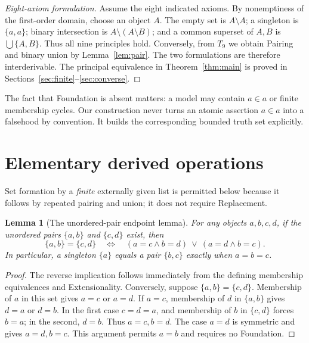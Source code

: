 \documentclass[11pt,a4paper]{article}
\numberwithin{equation}{section}
\newtheorem{lemma}[theorem]{Lemma}
\newcommand{\up}[2]{\{#1,#2\}}
\newcommand{\Tnine}{T_9}
\begin{document}
\begin{proof}[Eight-axiom formulation]
Assume the eight indicated axioms.  By nonemptiness of the first-order domain, choose an object $A$.  The empty set is $A\setminus A$; a singleton is $\up aa$; binary intersection is $A\setminus(A\setminus B)$; and a common superset of $A,B$ is $\bigcup\up AB$.  Thus all nine principles hold.  Conversely, from $\Tnine$ we obtain Pairing and binary union by Lemma~\ref{lem:pair}.  The two formulations are therefore interderivable.  The principal equivalence in Theorem~\ref{thm:main} is proved in Sections~\ref{sec:finite}--\ref{sec:converse}.
\end{proof}

The fact that Foundation is absent matters: a model may contain $a\in a$ or finite membership cycles.  Our construction never turns an atomic assertion $a\in a$ into a falsehood by convention.  It builds the corresponding bounded truth set explicitly.

\section{Elementary derived operations}\label{sec:elementary}
Set formation by a \emph{finite} externally given list is permitted below because it follows by repeated pairing and union; it does not require Replacement.

\begin{lemma}[The unordered-pair endpoint lemma]\label{lem:endpoints}
For any objects $a,b,c,d$, if the unordered pairs $\up ab$ and $\up cd$ exist, then
\[
\up ab=\up cd\quad\Longleftrightarrow\quad
(a=c\land b=d)\ \lor\ (a=d\land b=c).
\]
In particular, a singleton $\{a\}$ equals a pair $\up bc$ exactly when $a=b=c$.
\end{lemma}
\begin{proof}
The reverse implication follows immediately from the defining membership equivalences and Extensionality.  Conversely, suppose $\up ab=\up cd$.  Membership of $a$ in this set gives $a=c$ or $a=d$.  If $a=c$, membership of $d$ in $\up ab$ gives $d=a$ or $d=b$.  In the first case $c=d=a$, and membership of $b$ in $\up cd$ forces $b=a$; in the second, $d=b$.  Thus $a=c,b=d$.  The case $a=d$ is symmetric and gives $a=d,b=c$.  This argument permits $a=b$ and requires no Foundation.
\end{proof}
\end{document}
